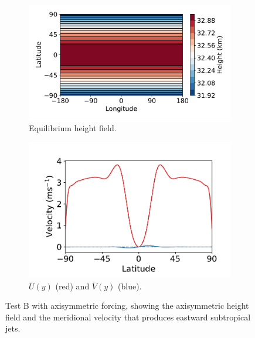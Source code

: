 \begin{figure}
  \centering
  \begin{subfigure}[t]{0.52\textwidth}
    \includegraphics[width=1.0\textwidth]{figures/eqm-zonal-flow/test-B-h.pdf}
    \caption{Equilibrium height field.}
    \label{fig:test-B-h}
  \end{subfigure}
  \begin{subfigure}[t]{0.47\textwidth}
    \includegraphics[width=1.0\textwidth]{figures/eqm-zonal-flow/test-B-u-v.pdf}
    \caption{$\overline{U}(y)$ (red) and $\overline{V}(y)$ (blue).}
    \label{fig:test-B-u-v}
  \end{subfigure}
  \caption{Test B with axisymmetric forcing, showing the axisymmetric height field and the meridional velocity that produces eastward subtropical jets.}
  \label{fig:nonlin-test-B}


\end{figure}
